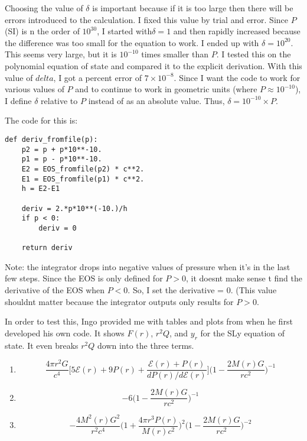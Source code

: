\documentclass[11pt]{article}
\numberwithin{equation}{section}
\begin{document}
Choosing the value of $\delta$ is important because if it is too large then there will be errors introduced to the calculation.  I fixed this value by trial and error.  Since $P$ (SI) is n the order of $10^{30}$,  I started with$\delta = 1$ and then rapidly increased because the difference was too small for the equation to work.  I ended up with $\delta = 10^{20}$.  This seems very large, but it is $10^{-10}$ times smaller than $P$.  I  tested this on the polynomial equation of state and compared it to the explicit derivation.  With this value of $delta$, I got a percent error of $7 \times 10^{-8}$.   Since I want the code to work for various values of $P$ and to continue to work in geometric units (where $P \approx  10^{-10}$), I define $\delta$ relative to $P$ instead of as an absolute value.  Thus, $\delta = 10^{-10} \times P$.

The code for this is:

\begin{lstlisting}
def deriv_fromfile(p):
    p2 = p + p*10**-10. 
    p1 = p - p*10**-10. 
    E2 = EOS_fromfile(p2) * c**2.
    E1 = EOS_fromfile(p1) * c**2. 
    h = E2-E1

    deriv = 2.*p*10**(-10.)/h
    if p < 0:
        deriv = 0
        
    return deriv
\end{lstlisting}

Note: the integrator drops into negative values of pressure when it's in the last few steps.  Since the EOS is only defined for $P>0$, it doesnt make sense t find the derivative of the EOS when $P<0$.  So, I set the derivative = 0.  (This value shouldnt matter because the integrator outputs only results for $P>0$.

In order to test this, Ingo provided me with tables and plots from when he first developed his own code.  It shows $F(r)$, $r^{2} Q$, and $y_r$ for the SLy equation of state.  It even breaks $r^2Q$ down into the three terms.  

\begin{enumerate}
\item
\begin{equation}
\frac{4 \pi r^{2} G}{c^{4}} \bigg[ 5 \mathcal{E}(r) + 9 P(r) + \frac{\mathcal{E}(r) + P(r)}{dP(r)/d\mathcal{E}(r)}   \bigg] \bigg(  1 - \frac{2 M(r) G}{r c^{2}} \bigg) ^{-1} 
\end{equation}
\item
\begin{equation}
- 6 \bigg( 1- \frac{2 M(r) G}{r c^{2}}  \bigg)^{-1}
\end{equation}
\item
\begin{equation}
- \frac{4 M^{2}(r) G^{2}}{r^{2}c^{4}} \bigg( 1 + \frac{4 \pi  r^3 P(r)}{M(r) c^{2}}  \bigg)^{2} \bigg( 1 - \frac{2 M(r) G}{r c^{2}} \bigg)^{-2}
\end{equation}
\end{enumerate}
\end{document}
